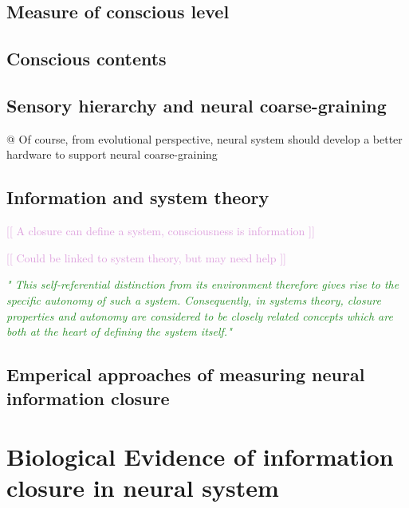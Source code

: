 \documentclass[utf8]{article}
\newenvironment{ants}
			{
			 \begin{easylist}[itemize]
			}
			{
			\end{easylist}
			}
\newcommand{\rewrite}[1]{\textcolor{ForestGreen}{\textit{"#1"}}\newline}
\newcommand{\idea}[1]{\noindent
				\textcolor{Plum}{[[ #1 ]]\newline}}
\begin{document}
		
		\subsection{Measure of conscious level}
		\subsection{Conscious contents}
		\subsection{Sensory hierarchy and neural coarse-graining}
		
			\begin{ants}
				@ Of course, from evolutional perspective, neural system should develop a better hardware to support neural coarse-graining
			\end{ants}


		\subsection{Information and system theory}
			\idea{A closure can define a system, consciousness is information}
			
			\idea{Could be linked to system theory, but may need help}
		
			\rewrite{
				This self-referential distinction from its environment therefore gives rise to the specific autonomy of such a system. Consequently, in systems theory, closure properties and autonomy are considered to be closely related concepts which are both at the heart of defining the system itself.}
		\subsection{Emperical approaches of measuring neural information closure}
		
		
	\section{Biological Evidence of information closure in neural system}
		
		
		
\end{document}
